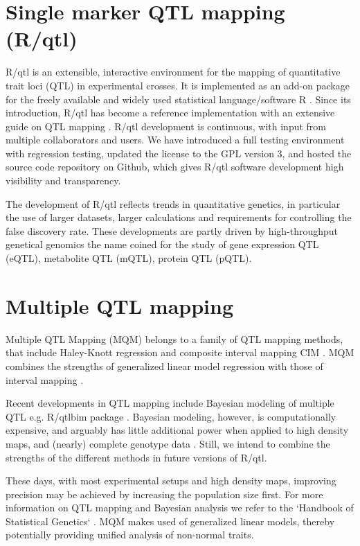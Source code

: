 \section{Single marker QTL mapping (R/qtl)}
R/qtl is an extensible, interactive environment for the mapping of quantitative trait loci (QTL) 
in experimental crosses. It is implemented as an add-on package for the freely available and 
widely used statistical language/software R \cite{R:2009}. Since its introduction, R/qtl 
\cite{Broman:2003} has become a reference implementation with an extensive guide on QTL mapping 
\cite{RQTLGuide:2009}. R/qtl development is continuous, with input from multiple collaborators 
and users.  We have introduced a full testing environment with regression testing, updated the 
license to the GPL version 3, and hosted the source code repository on Github, which gives R/qtl 
software development high visibility and transparency. 

The development of R/qtl reflects trends in quantitative genetics, in particular the use of 
larger datasets, larger calculations and requirements for controlling the false discovery rate. 
These developments are partly driven by high-throughput genetical genomics the name coined 
for the study of gene expression QTL (eQTL)\cite{Jansen:2001a}, metabolite QTL (mQTL), protein 
QTL (pQTL).

\section{Multiple QTL mapping}
Multiple QTL Mapping (MQM) belongs to a family of QTL mapping methods, that include Haley-Knott 
regression \cite{Haley:1992} and composite interval mapping CIM \cite{Zeng:1994}. MQM combines 
the strengths of generalized linear model regression with those of interval mapping 
\cite{Jansen:1993, Jansen:1994b}. 

Recent developments in QTL mapping include Bayesian modeling of multiple QTL e.g. R/qtlbim 
package \cite{Yandell:2007, Banerjee:2008}. Bayesian modeling, however, is computationally 
expensive, and arguably has little additional power when applied to high density maps, and 
(nearly) complete genotype data \cite{Handbook:Jansen:2007}. Still, we intend to combine the 
strengths of the different methods in future versions of R/qtl.

These days, with most experimental setups and high density maps, improving precision may be 
achieved by increasing the population size first. For more information on QTL mapping and 
Bayesian analysis we refer to the `Handbook of Statistical Genetics` \cite{Handbook:2007}. MQM 
makes used of generalized linear models, thereby potentially providing unified analysis of 
non-normal traits.

